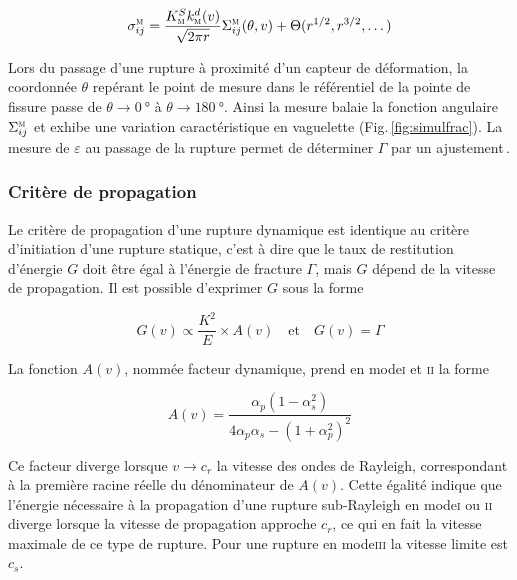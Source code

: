 \begin{equation}
\sigma_{ij}^\textsc{m}=\frac{K_\textsc{m}^Sk^d_\textsc{m}(v)}{\sqrt{2\pi r}}\Sigma^\textsc{m}_{ij}(\theta,v)+\Theta(r^{1/2},r^{3/2},\dots)
\label{eq:sigmamodedyn}
\end{equation}

Lors du passage d'une rupture à proximité d'un capteur de déformation, la coordonnée $\theta$ repérant le point de mesure dans le référentiel de la pointe de fissure passe de $\theta\rightarrow\SI{0}{\degree}$ à $\theta\rightarrow\SI{180}{\degree}$. Ainsi la mesure balaie la fonction angulaire $\Sigma_{ij}^\textsc{m}$ et exhibe une variation caractéristique en vaguelette (Fig.\,\ref{fig:simulfrac}). La mesure de $\varepsilon$ au passage de la rupture permet de déterminer $\Gamma$ par un ajustement\,\cite{svetlizky_brittle_2019}.

\newpage


\subsubsection{Critère de propagation}

Le critère de propagation d'une rupture dynamique est identique au critère d'initiation d'une rupture statique, c'est à dire que le taux de restitution d'énergie $G$ doit être égal à l'énergie de fracture $\Gamma$, mais $G$ dépend de la vitesse de propagation. Il est possible d'exprimer $G$ sous la forme

\begin{equation}
G(v)\propto\frac{K^2}{E}\times A(v)\quad\text{et}\quad G(v) = \Gamma
\label{eq:propagfracdyn}
\end{equation}

La fonction $A(v)$, nommée facteur dynamique, prend en mode\:\textsc{i} et \textsc{ii} la forme

\begin{equation}
A(v)=\dfrac{\alpha_p(1-\alpha_s^2)}{4\alpha_p\alpha_s-(1+\alpha_p^2)^2}
\end{equation}

Ce facteur diverge lorsque $v\rightarrow c_r$ la vitesse des ondes de Rayleigh, correspondant à la première racine réelle du dénominateur de $A(v)$. Cette égalité indique que l'énergie nécessaire à la propagation d'une rupture sub-Rayleigh en mode\:\textsc{i} ou \textsc{ii} diverge lorsque la vitesse de propagation approche $c_r$, ce qui en fait la vitesse maximale de ce type de rupture. Pour une rupture en mode\:\textsc{iii} la vitesse limite est $c_s$.






